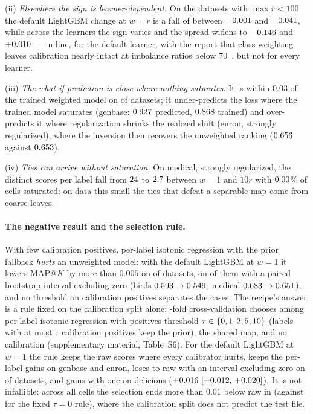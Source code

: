 \documentclass[runningheads]{llncs}
\makeatletter
\newcommand{\mapk}{\mathrm{MAP}@K\xspace}
\newcommand{\Supp}[1]{supplementary material, #1}  %
\makeatother
\begin{document}
(ii) \emph{Elsewhere the sign is learner-dependent.} On the \nnMulanModest{} datasets with $\max r<100$ the default LightGBM change at $w{=}r$ is a fall of between $-0.001$ and $-0.041$, while across the \nnLearners{} learners the sign varies and the spread widens to $-0.146$ and $+0.010$ --- in line, for the default learner, with the report that class weighting leaves calibration nearly intact at imbalance ratios below 70~\cite{Liu2026Resampling}, but not for every learner.

(iii) \emph{The what-if prediction is close where nothing saturates.} It is within $0.03$ of the trained weighted model on \nnWhatifClose{} of \nnMulan{} datasets; it under-predicts the loss where the trained model saturates (genbase: $0.927$ predicted, $0.868$ trained) and over-predicts it where regularization shrinks the realized shift (enron, strongly regularized), where the inversion then recovers the unweighted ranking ($0.656$ against $0.653$).

(iv) \emph{Ties can arrive without saturation.} On medical, strongly regularized, the distinct scores per label fall from $24$ to $2.7$ between $w{=}1$ and $10r$ with $0.00$\% of cells saturated: on data this small the ties that defeat a separable map come from coarse leaves.

\paragraph{The negative result and the selection rule.} With few calibration positives, per-label isotonic regression with the prior fallback \emph{hurts} an unweighted model: with the default LightGBM at $w{=}1$ it lowers $\mapk$ by more than $0.005$ on \nnHurtDefault{} of \nnMulan{} datasets, on \nnHurtTauZeroCI{} of them with a paired bootstrap interval excluding zero (birds $0.593\to0.549$; medical $0.683\to0.651$), and no threshold on calibration positives separates the cases. The recipe's answer is a rule fixed on the calibration split alone: \ntauFolds-fold cross-validation chooses among per-label isotonic regression with positives threshold $\tau\in\{0, 1, 2, 5, 10\}$ (labels with at most $\tau$ calibration positives keep the prior), the shared map, and no calibration (\Supp{Table~S6}). For the default LightGBM at $w{=}1$ the rule keeps the raw scores where every calibrator hurts, keeps the per-label gains on genbase and enron, loses to raw with an interval excluding zero on \nnHurtAfterTau{} of \nnMulan{} datasets, and gains with one on delicious ($+0.016~[+0.012,\,+0.020]$). It is not infallible: across all \nnTauCells{} cells the selection ends more than $0.01$ below raw in \nnTauSelBelowRaw{} (against \nnTauZeroBelowRaw{} for the fixed $\tau=0$ rule), where the calibration split does not predict the test file.
\end{document}
